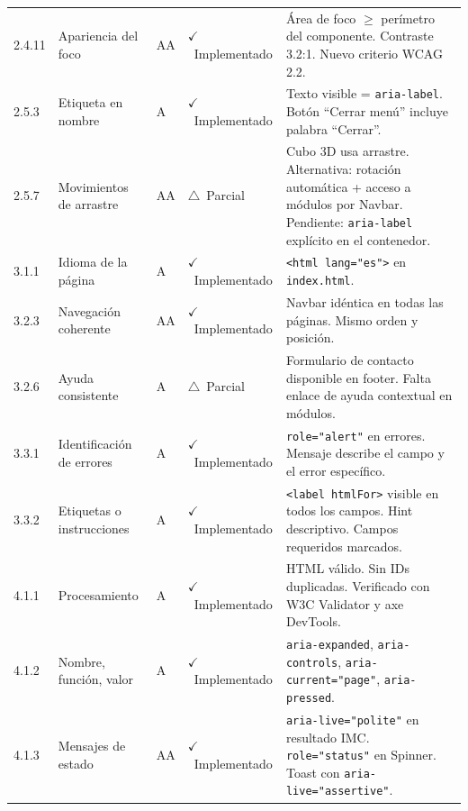 \documentclass[12pt, a4paper]{article}
\newcommand{\cmark}{\textcolor{successgreen}{$\checkmark$}}
\newcommand{\wmark}{\textcolor{warningyellow}{$\triangle$}}
\begin{document}
\begin{longtable}{@{}>{\ttfamily\small}p{1.2cm} p{3.2cm} >{\centering\arraybackslash}p{0.9cm} >{\centering\arraybackslash\small}p{2.5cm} p{5.5cm}@{}}
2.4.11 & Apariencia del foco & AA & \textcolor{successgreen}{\cmark~Implementado} & Área de foco $\geq$ perímetro del componente. Contraste 3.2:1. Nuevo criterio WCAG 2.2. \\

2.5.3 & Etiqueta en nombre & A & \textcolor{successgreen}{\cmark~Implementado} & Texto visible = \texttt{aria-label}. Botón ``Cerrar menú'' incluye palabra ``Cerrar''. \\

2.5.7 & Movimientos de arrastre & AA & \textcolor{warningyellow}{\wmark~Parcial} & Cubo 3D usa arrastre. Alternativa: rotación automática + acceso a módulos por Navbar. Pendiente: \texttt{aria-label} explícito en el contenedor. \\

3.1.1 & Idioma de la página & A & \textcolor{successgreen}{\cmark~Implementado} & \texttt{<html lang="es">} en \texttt{index.html}. \\

3.2.3 & Navegación coherente & AA & \textcolor{successgreen}{\cmark~Implementado} & Navbar idéntica en todas las páginas. Mismo orden y posición. \\

3.2.6 & Ayuda consistente & A & \textcolor{warningyellow}{\wmark~Parcial} & Formulario de contacto disponible en footer. Falta enlace de ayuda contextual en módulos. \\

3.3.1 & Identificación de errores & A & \textcolor{successgreen}{\cmark~Implementado} & \texttt{role="alert"} en errores. Mensaje describe el campo y el error específico. \\

3.3.2 & Etiquetas o instrucciones & A & \textcolor{successgreen}{\cmark~Implementado} & \texttt{<label htmlFor>} visible en todos los campos. Hint descriptivo. Campos requeridos marcados. \\

4.1.1 & Procesamiento & A & \textcolor{successgreen}{\cmark~Implementado} & HTML válido. Sin IDs duplicadas. Verificado con W3C Validator y axe DevTools. \\

4.1.2 & Nombre, función, valor & A & \textcolor{successgreen}{\cmark~Implementado} & \texttt{aria-expanded}, \texttt{aria-controls}, \texttt{aria-current="page"}, \texttt{aria-pressed}. \\

4.1.3 & Mensajes de estado & AA & \textcolor{successgreen}{\cmark~Implementado} & \texttt{aria-live="polite"} en resultado IMC. \texttt{role="status"} en Spinner. Toast con \texttt{aria-live="assertive"}. \\

\end{longtable}
\end{document}
